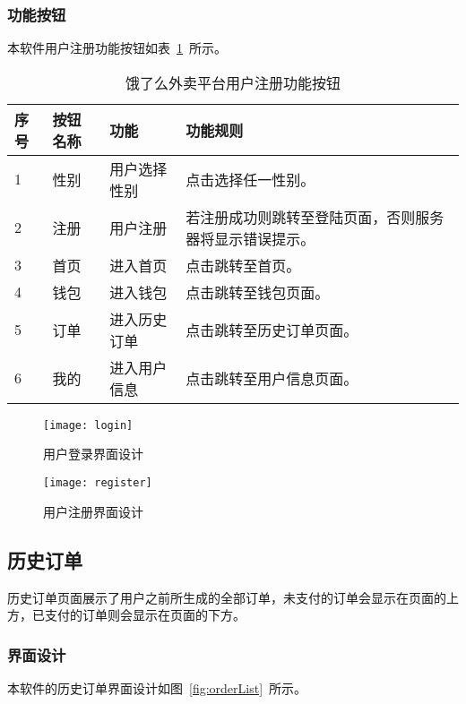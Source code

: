 \subsubsection{功能按钮}
本软件用户注册功能按钮如表~\ref{tab:table11}~所示。
\begin{table}[htbp]
    \caption{饿了么外卖平台用户注册功能按钮}\label{tab:table11}
    \vspace{0.5em}\wuhao
    \begin{tabularx}{\textwidth}{lllX}
    \toprule[1.5pt]
    序号 & 按钮名称 & 功能 & 功能规则 \\ 
    \midrule[1pt]
    1 & 性别 & 用户选择性别 & 点击选择任一性别。 \\
    2 & 注册 & 用户注册 & 若注册成功则跳转至登陆页面，否则服务器将显示错误提示。 \\
    3 & 首页 & 进入首页 & 点击跳转至首页。 \\
    4 & 钱包 & 进入钱包 & 点击跳转至钱包页面。 \\
    5 & 订单 & 进入历史订单 & 点击跳转至历史订单页面。 \\
    6 & 我的 & 进入用户信息 & 点击跳转至用户信息页面。 \\
\bottomrule[1.5pt]
\end{tabularx}
\vspace{\baselineskip}
\end{table}
\begin{figure}[htbp]
    \centering
    \begin{minipage}{0.4\textwidth}
    \centering
    \texttt{[image: login]}
    \caption{用户登录界面设计}\label{fig:login}
    \end{minipage}
    \begin{minipage}{0.4\textwidth}
    \centering
    \texttt{[image: register]}
    \caption{用户注册界面设计}\label{fig:register}
    \end{minipage}
    \vspace{\baselineskip}
\end{figure}

\subsection{历史订单}
历史订单页面展示了用户之前所生成的全部订单，未支付的订单会显示在页面的上方，已支付的订单则会显示在页面的下方。
\subsubsection{界面设计}
本软件的历史订单界面设计如图~\ref{fig:orderList}~所示。
